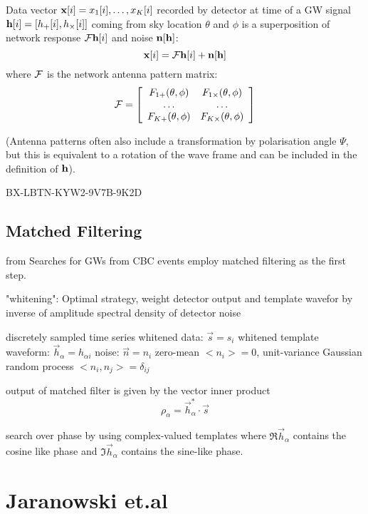 Data vector ${\mathbf{x}} [i]={x_1[i], \ldots , x_K[i]}$ recorded by detector at time of a GW signal $\mathbf{h} [i] = [h_+[i], h_{\times}[i] ]$ coming from sky location $\theta$ and $\phi$ is a superposition of network response $\mathcal{F} \mathbf{h}[i]$ and noise $\mathbf{n}[\mathbf{h}]$:
\[ {\mathbf{x}} [i] = \mathcal{F} \mathbf{h}[i]+\mathbf{n}[\mathbf{h}] \]
where $\mathcal{F}$ is the network antenna pattern matrix:
\[ \mathcal{F} = \left[ \begin{array}{cc} 
				F_{1+}(\theta, \phi) & F_{1\times}(\theta, \phi) \\
				\ldots				& \ldots	\\
				F_{K+}(\theta, \phi) & F_{K \times}(\theta, \phi) \end{array} \right] \]

(Antenna patterns often also include a transformation by polarisation angle $\Psi$, but this is equivalent to a rotation of the wave frame and can be included in the definition of $\mathbf{h}$).

BX-LBTN-KYW2-9V7B-9K2D
\subsection{Matched Filtering}

from \cite{PhysRevD.82.044025}
Searches for GWs from CBC events employ matched filtering as the first step. 

"whitening": Optimal strategy, weight detector output and template wavefor by inverse of amplitude spectral density of detector noise 

discretely sampled time series
whitened data: $\overrightarrow{s}={s_i}$
whitened template waveform: $\overrightarrow{h}_\alpha = h_{\alpha i}$
noise: $\overrightarrow{n}={n_i}$ zero-mean $<n_i>=0$, unit-variance Gaussian random process $<n_i,n_j>=\delta_{ij}$


output of matched filter is given by the vector inner product 
\begin{equation}
\rho_\alpha = \overrightarrow{h}_\alpha^*\cdot \overrightarrow{s}
\end{equation}

search over phase by using complex-valued templates where $\mathfrak{R}\overrightarrow{h}_\alpha$ contains the cosine like phase and $\mathfrak{I}\overrightarrow{h}_\alpha$ contains the sine-like phase. 

\section{Jaranowski et.al}

